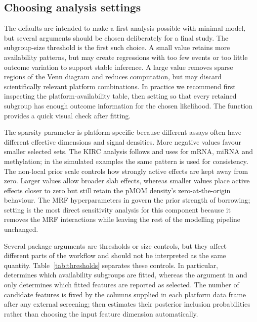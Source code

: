 \documentclass[article]{jss}
\begin{document}
\subsection{Choosing analysis settings}\label{sec:settings}

The defaults are intended to make a first analysis possible with minimal
model, but several arguments should be chosen deliberately for a final
study.  The subgroup-size threshold  is the first such choice.  A
small value retains more availability patterns, but may create regressions with
too few events or too little outcome variation to support stable inference.  A
large value removes sparse regions of the Venn diagram and reduces computation,
but may discard scientifically relevant platform combinations.  In practice we
recommend first inspecting the platform-availability table, then setting
 so that every retained subgroup has enough outcome information for
the chosen likelihood.  The function  provides a
quick visual check after fitting.

The sparsity parameter  is platform-specific because different assays
often have different effective dimensions and signal densities.  More negative
values favour smaller selected sets.  The KIRC analysis follows
\citet{chekouo2017} and uses  for mRNA, miRNA and
methylation; in the simulated examples the same pattern is used for consistency.
The non-local prior scale  controls how strongly active effects are
kept away from zero.  Larger values allow broader slab effects, whereas smaller
values place active effects closer to zero but still retain the pMOM density's
zero-at-the-origin behaviour.  The MRF hyperparameters in
 govern the prior strength of borrowing; setting
 is the most direct sensitivity analysis for this component
because it removes the MRF interactions while leaving the rest of the modelling
pipeline unchanged.

Several package arguments are thresholds or size controls, but they affect
different parts of the workflow and should not be interpreted as the same
quantity.  Table~\ref{tab:thresholds} separates these controls.  In particular,
 determines which availability subgroups are fitted, whereas the
 argument in  and  only determines
which fitted features are reported as selected.  The number of candidate
features is fixed by the columns supplied in each platform data frame after any
external screening;  then estimates their posterior
inclusion probabilities rather than choosing the input feature dimension
automatically.
\end{document}
